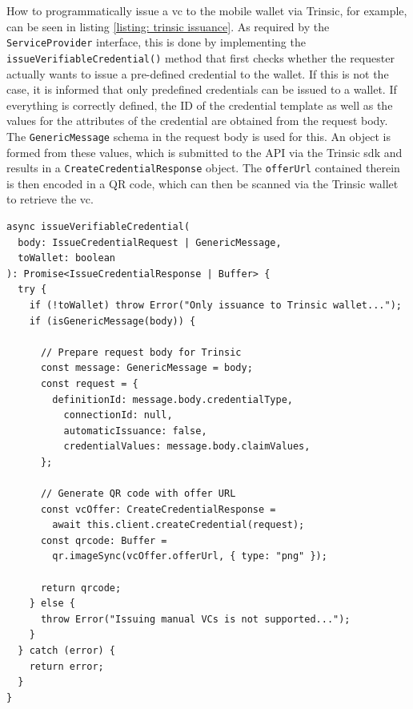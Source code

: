    How to programmatically issue a \ac{vc} to the mobile wallet via Trinsic, for example, can be seen in listing \ref{listing: trinsic issuance}. As required by the \texttt{ServiceProvider} interface, this is done by implementing the \texttt{issueVerifiableCredential()} method that first checks whether the requester actually wants to issue a pre-defined credential to the wallet. If this is not the case, it is informed that only predefined credentials can be issued to a wallet. If everything is correctly defined, the ID of the credential template as well as the values for the attributes of the credential are obtained from the request body. The \texttt{GenericMessage} schema in the request body is used for this. An object is formed from these values, which is submitted to the API via the Trinsic \ac{sdk} and results in a \texttt{CreateCredentialResponse} object. The \texttt{offerUrl} contained therein is then encoded in a QR code, which can then be scanned via the Trinsic wallet to retrieve the \ac{vc}. 
    \newline
    
    \begin{lstlisting}[style=ES6, caption=\acs{vc} issuance with Trinsic, label={listing: trinsic issuance}]
async issueVerifiableCredential(
  body: IssueCredentialRequest | GenericMessage,
  toWallet: boolean
): Promise<IssueCredentialResponse | Buffer> {
  try {
    if (!toWallet) throw Error("Only issuance to Trinsic wallet...");
    if (isGenericMessage(body)) {
    
      // Prepare request body for Trinsic
      const message: GenericMessage = body;
      const request = {
        definitionId: message.body.credentialType,
          connectionId: null,
          automaticIssuance: false,
          credentialValues: message.body.claimValues,
      };
      
      // Generate QR code with offer URL
      const vcOffer: CreateCredentialResponse = 
        await this.client.createCredential(request);
      const qrcode: Buffer = 
        qr.imageSync(vcOffer.offerUrl, { type: "png" });
        
      return qrcode;
    } else {
      throw Error("Issuing manual VCs is not supported...");
    }
  } catch (error) {
    return error;
  }
}\end{lstlisting}

